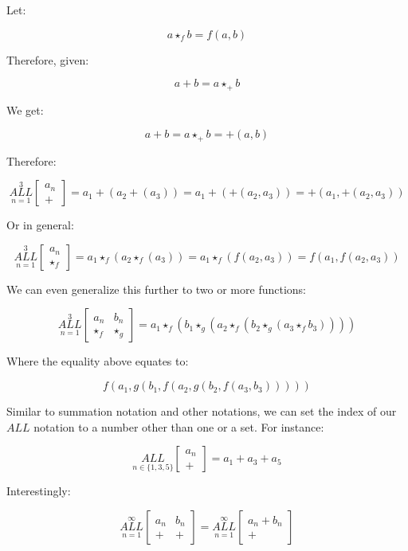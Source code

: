 \documentclass{article}
\begin{document}
$${}$$

Let:

$$a \star_f b = f(a,b)$$

Therefore, given:

$$a+b= a \star_+ b$$

We get:

$$a+b= a \star_+ b = +(a,b)$$

Therefore:

$$\underset{n=1}{\overset{3}{ALL}} \begin{bmatrix}
a_n \\
+
\end{bmatrix} = a_1+(a_2+(a_3)) = a_1+(+(a_2,a_3))=+(a_1,+(a_2,a_3))$$

Or in general:

$$\underset{n=1}{\overset{3}{ALL}} \begin{bmatrix}
a_n \\
\star_f
\end{bmatrix} = a_1\star_f(a_2\star_f(a_3)) = a_1\star_f(f(a_2,a_3))=f(a_1,f(a_2,a_3))$$

We can even generalize this further to two or more functions:

$$\underset{n=1}{\overset{3}{ALL}} \begin{bmatrix}
a_n & b_n\\
\star_f & \star_g
\end{bmatrix} = a_1 \star_f (b_1 \star_g (a_2  \star_f (b_2 \star_g (a_3 \star_f b_3))))$$

Where the equality above equates to:

$$f(a_1,g(b_1,f(a_2,g(b_2,f(a_3,b_3)))))$$

Similar to summation notation and other notations, we can set the index of our $ALL$ notation to a number other than one or a set. For instance:

$$\underset{n\in \{ 1, 3, 5 \}}{ALL} \begin{bmatrix}
a_n \\
+
\end{bmatrix} = a_1+a_3+a_5$$

Interestingly:

$$\underset{n=1}{\overset{\infty}{ALL}} \begin{bmatrix}
a_n & b_n \\
+& +
\end{bmatrix} = \underset{n=1}{\overset{\infty}{ALL}} \begin{bmatrix}
a_n + b_n \\
 +
\end{bmatrix}$$
\end{document}
